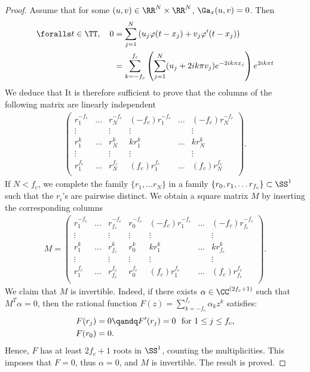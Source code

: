 \begin{proof}
Assume that for some $(u,v)\in \RR^N\times \RR^N$, $\Ga_x (u,v)=0$. Then
\begin{align*}
	\foralls  t\in \TT, \quad 0&=\sum_{j=1}^N  \left(u_j\varphi(t-x_j)+v_j \varphi'(t-x_j)\right)\\
&=\sum_{k=-f_c}^{f_c} \left(\sum_{j=1}^N (u_j + 2ik\pi v_j)e^{-2ik\pi x_j}  \right) e^{2ik\pi t}
\end{align*}
We deduce that 
It is therefore sufficient to prove that the columns of the following matrix are linearly independent
\begin{align*}
\begin{pmatrix}
r_1^{-f_c} & \ldots &r_N^{-f_c} & (-f_c)r_1^{-f_c}& \ldots &(-f_c)r_N^{-f_c} \\
\vdots & &\vdots  & \vdots & &\vdots \\
r_1^{k} & \ldots &r_N^{k} & kr_1^{k}& \ldots &k r_N^{k} \\
\vdots & &\vdots  & \vdots & &\vdots \\
r_1^{f_c} & \ldots &r_N^{f_c} & (f_c)r_1^{f_c}& \ldots &(f_c)r_N^{f_c} \\
\end{pmatrix}.
\end{align*}
If $N<f_c$, we complete the family $\{r_1, \ldots r_N\}$ in a family $\{r_0,r_1,\ldots r_{f_c}\}\subset \SS^1$ such
 that the $r_i$'s are pairwise distinct. We obtain a square matrix $M$ by inserting the corresponding columns
\begin{align*}
M = \begin{pmatrix}
r_1^{-f_c} & \ldots &r_{f_c}^{-f_c} & r_0^{-f_c} &(-f_c)r_1^{-f_c}& \ldots &(-f_c)r_{f_c}^{-f_c} \\
\vdots & &\vdots  &\vdots & \vdots & &\vdots \\
r_1^{k} & \ldots &r_{f_c}^{k} & r_0^k &kr_1^{k}& \ldots &k r_{f_c}^{k} \\
\vdots & &\vdots &\vdots & \vdots & &\vdots \\
r_1^{f_c} & \ldots &r_{f_c}^{f_c} & r_0^{f_c}&(f_c)r_1^{f_c}& \ldots &(f_c)r_{f_c}^{f_c} \\
\end{pmatrix}.
\end{align*}
 We claim that $M$ is invertible. Indeed, if there exists $\alpha\in \CC^{(2f_c+1)}$ such that
  $M^T \alpha=0$, then the rational function $F(z) = \sum_{k=-f_c}^{f_c} \alpha_k z^{k}$ satisfies:
\begin{align*}
  	F(r_j)&=0 \qandq F'(r_j)=0 \ \mbox{ for } 1\leq j \leq f_c,\\
  	F(r_0)&=0.
\end{align*}
Hence, $F$ has at least $2f_c+1$ roots in $\SS^1$, counting the multiplicities. This imposes that $F=0$, thus $\alpha=0$,
 and $M$ is invertible. The result is proved.
\end{proof}


